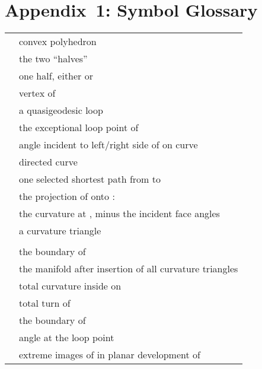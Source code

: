 \pdfoutput=1  \documentclass[]{article}
\begin{document}
\section*{Appendix~1: Symbol Glossary}
\begin{tabular}{l l}
 
   & convex polyhedron \\
 
   & the two ``halves''  \\

   & one half, either  or  \\
 
   & vertex of  \\
 
   & a quasigeodesic loop \\

   & the exceptional loop point of  \\

   & angle incident to left/right side of  on curve \\

   & directed curve \\

   & one selected shortest path from  to  \\

   & the projection of  onto :  \\

   & the curvature at ,  minus the incident face angles \\

   & a curvature triangle \\

   &  \\

   & the boundary of  \\

   & the manifold  after insertion of all curvature triangles  \\

   & total curvature inside  on  \\

   & total turn of  \\

   & the boundary of   \\

   & angle  at the loop point  \\

   & extreme images of  in planar development of  \\


\end{tabular}
\end{document}
